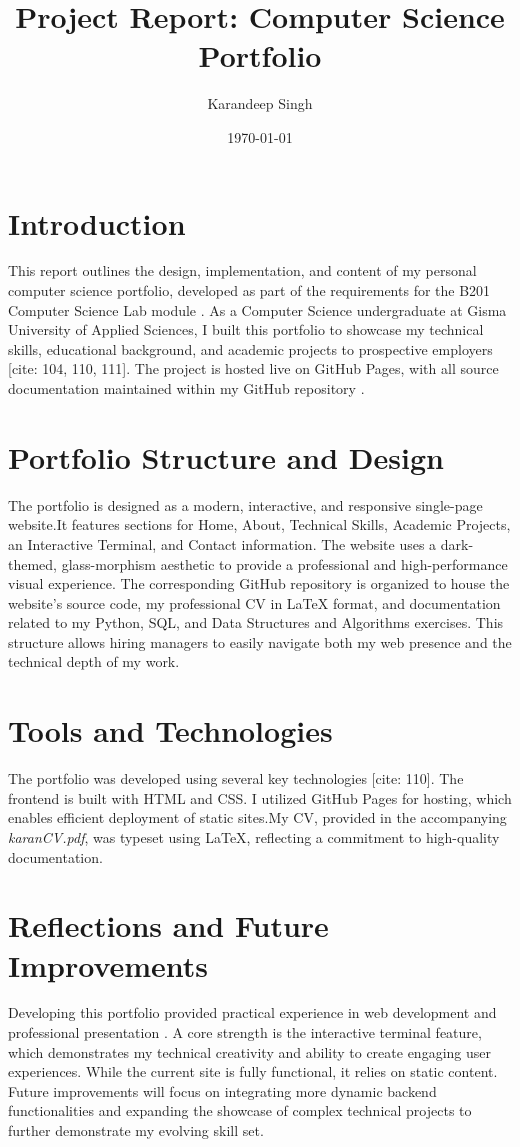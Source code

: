 \documentclass{article}
\title{Project Report: Computer Science Portfolio}
\author{Karandeep Singh}
\date{\today}
\begin{document}
\maketitle

\section{Introduction}
This report outlines the design, implementation, and content of my personal computer science portfolio, developed as part of the requirements for the B201 Computer Science Lab module . As a Computer Science undergraduate at Gisma University of Applied Sciences, I built this portfolio to showcase my technical skills, educational background, and academic projects to prospective employers [cite: 104, 110, 111]. The project is hosted live on GitHub Pages, with all source documentation maintained within my GitHub repository .

\section{Portfolio Structure and Design}
The portfolio is designed as a modern, interactive, and responsive single-page website.It features sections for Home, About, Technical Skills, Academic Projects, an Interactive Terminal, and Contact information. The website uses a dark-themed, glass-morphism aesthetic to provide a professional and high-performance visual experience. The corresponding GitHub repository is organized to house the website's source code, my professional CV in LaTeX format, and documentation related to my Python, SQL, and Data Structures and Algorithms exercises. This structure allows hiring managers to easily navigate both my web presence and the technical depth of my work.

\section{Tools and Technologies}
The portfolio was developed using several key technologies [cite: 110]. The frontend is built with HTML and CSS. I utilized GitHub Pages for hosting, which enables efficient deployment of static sites.My CV, provided in the accompanying \textit{karanCV.pdf}, was typeset using LaTeX, reflecting a commitment to high-quality documentation.

\section{Reflections and Future Improvements}
Developing this portfolio provided practical experience in web development and professional presentation . A core strength is the interactive terminal feature, which demonstrates my technical creativity and ability to create engaging user experiences. While the current site is fully functional, it relies on static content. Future improvements will focus on integrating more dynamic backend functionalities and expanding the showcase of complex technical projects to further demonstrate my evolving skill set.
\end{document}
